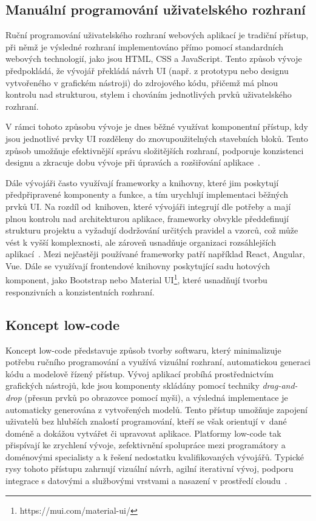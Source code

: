 \subsection{Manuální programování uživatelského rozhraní}
Ruční programování uživatelského rozhraní webových aplikací je tradiční přístup, při němž je výsledné rozhraní implementováno přímo pomocí standardních webových technologií, jako jsou HTML, CSS a JavaScript. Tento způsob vývoje předpokládá, že vývojář překládá návrh UI (např. z prototypu nebo designu vytvořeného v grafickém nástroji) do zdrojového kódu, přičemž má plnou kontrolu nad strukturou, stylem i chováním jednotlivých prvků uživatelského rozhraní.

V rámci tohoto způsobu vývoje je dnes běžné využívat komponentní přístup, kdy jsou jednotlivé prvky UI rozděleny do znovupoužitelných stavebních bloků. Tento způsob umožňuje efektivnější správu složitějších rozhraní, podporuje konzistenci designu a zkracuje dobu vývoje při úpravách a rozšiřování aplikace~\cite{ComponentArch}.

Dále vývojáři často využívají frameworky a knihovny, které jim poskytují předpřipravené komponenty a funkce, a tím urychlují implementaci běžných prvků UI. Na rozdíl od~knihoven, které vývojáři integrují dle potřeby a mají plnou kontrolu nad architekturou aplikace, frameworky obvykle předdefinují strukturu projektu a vyžadují dodržování určitých pravidel a vzorců, což může vést k vyšší komplexnosti, ale zároveň usnadňuje organizaci rozsáhlejších aplikací~\cite{ManualImplementation}. Mezi nejčastěji používané frameworky patří například React, Angular, Vue. Dále se využívají frontendové knihovny poskytující sadu hotových komponent, jako Bootstrap nebo Material UI\footnote{https://mui.com/material-ui/}, které usnadňují tvorbu responzivních a konzistentních rozhraní.

\subsection{Koncept low-code}
\label{LowCode}
Koncept low-code představuje způsob tvorby softwaru, který minimalizuje potřebu ručního programování a využívá vizuální rozhraní, automatickou generaci kódu a modelově řízený přístup. Vývoj aplikací probíhá prostřednictvím grafických nástrojů, kde jsou komponenty skládány pomocí techniky \textit{drag-and-drop} (přesun prvků po obrazovce pomocí myši), a výsledná implementace je automaticky generována z vytvořených modelů. Tento přístup umožňuje zapojení uživatelů bez hlubších znalostí programování, kteří se však orientují v~dané doméně a dokážou vytvářet či upravovat aplikace. Platformy low-code tak přispívají ke zrychlení vývoje, zefektivnění spolupráce mezi programátory a doménovými specialisty a k řešení nedostatku kvalifikovaných vývojářů. Typické rysy tohoto přístupu zahrnují vizuální návrh, agilní iterativní vývoj, podporu integrace s datovými a službovými vrstvami a nasazení v prostředí cloudu~\cite{LowCodeKirikova}.

